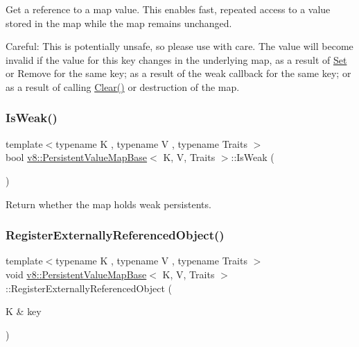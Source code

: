 Get a reference to a map value. This enables fast, repeated access to a value stored in the map while the map remains unchanged.

Careful\+: This is potentially unsafe, so please use with care. The value will become invalid if the value for this key changes in the underlying map, as a result of \mbox{\hyperlink{classv8_1_1Set}{Set}} or Remove for the same key; as a result of the weak callback for the same key; or as a result of calling \mbox{\hyperlink{classv8_1_1PersistentValueMapBase_a1bf074e7a7c24713c9a3d40ddce89e74}{Clear()}} or destruction of the map. \mbox{\label{classv8_1_1PersistentValueMapBase_a9f824b13dd30605589508db2740dd678}} 
\subsubsection{\texorpdfstring{Is\+Weak()}{IsWeak()}}
{\footnotesize\ttfamily template$<$typename K , typename V , typename Traits $>$ \\
bool \mbox{\hyperlink{classv8_1_1PersistentValueMapBase}{v8\+::\+Persistent\+Value\+Map\+Base}}$<$ K, V, Traits $>$\+::Is\+Weak (\begin{DoxyParamCaption}{ }\end{DoxyParamCaption})\hspace{0.3cm}{\ttfamily [inline]}}

Return whether the map holds weak persistents. \mbox{\label{classv8_1_1PersistentValueMapBase_a7d1cd63172b997dfaac9d0f009edd709}} 
\subsubsection{\texorpdfstring{Register\+Externally\+Referenced\+Object()}{RegisterExternallyReferencedObject()}}
{\footnotesize\ttfamily template$<$typename K , typename V , typename Traits $>$ \\
void \mbox{\hyperlink{classv8_1_1PersistentValueMapBase}{v8\+::\+Persistent\+Value\+Map\+Base}}$<$ K, V, Traits $>$\+::Register\+Externally\+Referenced\+Object (\begin{DoxyParamCaption}\item[{K \&}]{key }\end{DoxyParamCaption})\hspace{0.3cm}{\ttfamily [inline]}}

